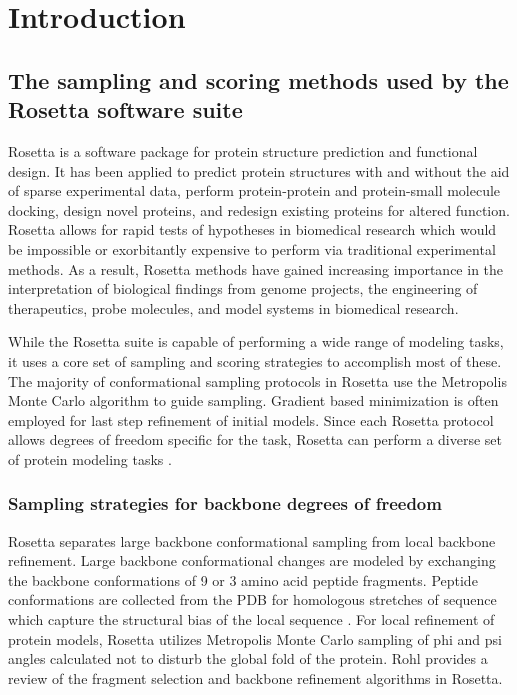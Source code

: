 \chapter{Introduction}
\label{chap:introduction}
\section{The sampling and scoring methods used by the Rosetta software suite}
\label{sec:rosetta_intro}
Rosetta is a software package for protein structure prediction and functional design.
It has been applied to predict protein structures with and without the aid of sparse experimental data, perform protein-protein and protein-small molecule docking, design novel proteins, and redesign existing proteins for altered function.
Rosetta allows for rapid tests of hypotheses in biomedical research which would be impossible or exorbitantly expensive to perform via traditional experimental methods.
As a result, Rosetta methods have gained increasing importance in the interpretation of biological findings from genome projects, the engineering of therapeutics, probe molecules, and model systems in biomedical research. 

While the Rosetta suite is capable of performing a wide range of modeling tasks, it uses a core set of sampling and scoring strategies to accomplish most of these. 
The majority of conformational sampling protocols in Rosetta use the Metropolis Monte Carlo algorithm to guide sampling.
Gradient based minimization is often employed for last step refinement of initial models.
Since each Rosetta protocol allows degrees of freedom specific for the task, Rosetta can perform a diverse set of protein modeling tasks  \citep{Wang:2007du}.

\subsection{Sampling strategies for backbone degrees of freedom}
Rosetta separates large backbone conformational sampling from local backbone refinement.
Large backbone conformational changes are modeled by exchanging the backbone conformations of 9 or 3 amino acid peptide fragments.
Peptide conformations are collected from the \ac{PDB} for homologous stretches of sequence  \citep{Simons:1997do} which capture the structural bias of the local sequence  \citep{Bystroff:1996vl}.
For local refinement of protein models, Rosetta utilizes Metropolis Monte Carlo sampling of phi and psi angles calculated not to disturb the global fold of the protein.
Rohl  \citep{Rohl:2004dh} provides a review of the fragment selection and backbone refinement algorithms in Rosetta. 

